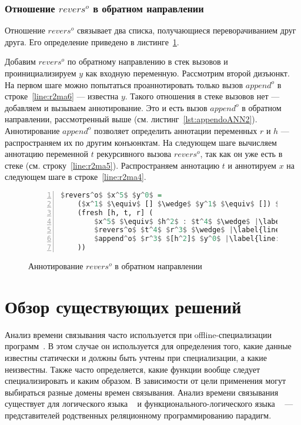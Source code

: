 \documentclass[conference,american,russian]{IEEEtran}
\begin{document}
\subsubsection{Отношение $revers^o$ в обратном направлении}

Отношение $revers^o$ связывает два списка, получающиеся переворачиванием друг друга.
Его определение приведено в листинге~\ref{lst:reversoANN2}.

Добавим $revers^o$ по обратному направлению в стек вызовов и проинициализируем $y$ как входную переменную.
Рассмотрим второй дизъюнкт.
На первом шаге можно попытаться проаннотировать только вызов $append^o$ в строке~\ref{line:r2ma6} --- известна $y$.
Такого отношения в стеке вызовов нет --- добавляем и вызываем аннотирование.
Это и есть вызов $append^o$ в обратном направлении, рассмотренный выше (см. листинг~\ref{lst:appendoANN2}).
Аннотирование $append^o$ позволяет определить аннотации переменных $r$ и $h$ --- распространяем их по другим конъюнктам.
На следующем шаге вычисляем аннотацию переменной $t$ рекурсивного вызова $revers^o$, так как он уже есть в стеке (см. строку~\ref{line:r2ma5}).
Распространяем аннотацию $t$ и аннотируем $x$ на следующем шаге в строке~\ref{line:r2ma4}.

\begin{figure}[h!]
  \begin{center}
  \begin{minipage}{0.32\textwidth}
  \begin{lstlisting}[language=Haskell, frame=single, numbers=left,numberstyle=\small, escapechar=|]
  $revers^o$ $x^5$ $y^0$ =
    ($x^1$ $\equiv$ [] $\wedge$ $y^1$ $\equiv$ []) $\vee$ |\label{line:r2ma2}|
    (fresh [h, t, r] (
        $x^5$ $\equiv$ $h^2$ : $t^4$ $\wedge$ |\label{line:r2ma4}|
        $revers^o$ $t^4$ $r^3$ $\wedge$ |\label{line:r2ma5}|
        $append^o$ $r^3$ $[h^2]$ $y^0$ |\label{line:r2ma6}|
    ))
    \end{lstlisting}
  \end{minipage}
  \end{center}
  \caption{Аннотирование $revers^o$ в обратном направлении}
  \label{lst:reversoANN2}
\end{figure}

\section{Обзор существующих решений}\label{related}

Анализ времени связывания часто используется при offline-специализации программ~\cite{jones1993partial}. 
В этом случае он используется для определения того, какие данные известны статически и должны быть учтены при специализации, а какие неизвестны. 
Также часто определяется, какие функции вообще следует специализировать и каким образом. 
В зависимости от цели применения могут выбираться разные домены времен связывания.
Анализ времени связывания существует для логического языка \prolog{}~\cite{leuschel2004prolog} и функционального-логического языка \mercury{}~\cite{vanhoof2004binding} --- представителей родственных реляционному программированию парадигм.
\end{document}
